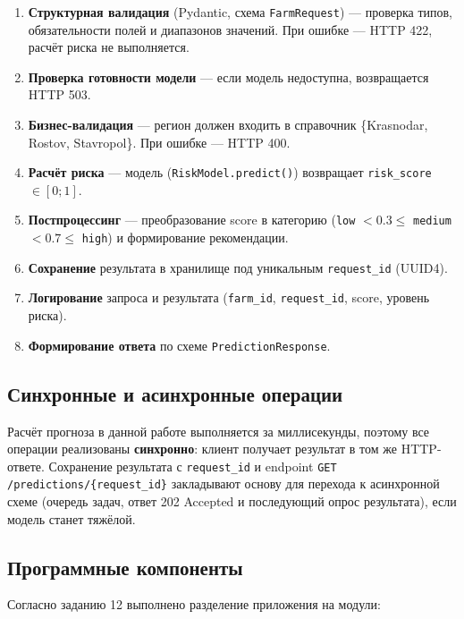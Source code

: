 \documentclass[12pt,a4paper]{article}
\begin{document}
\begin{enumerate}
    \item \textbf{Структурная валидация} (Pydantic, схема \texttt{FarmRequest}) --- проверка типов, обязательности полей и диапазонов значений. При ошибке --- HTTP 422, расчёт риска не выполняется.
    \item \textbf{Проверка готовности модели} --- если модель недоступна, возвращается HTTP 503.
    \item \textbf{Бизнес-валидация} --- регион должен входить в справочник \{Krasnodar, Rostov, Stavropol\}. При ошибке --- HTTP 400.
    \item \textbf{Расчёт риска} --- модель (\texttt{RiskModel.predict()}) возвращает \texttt{risk\_score} $\in [0; 1]$.
    \item \textbf{Постпроцессинг} --- преобразование score в категорию (\texttt{low} $< 0.3 \le$ \texttt{medium} $< 0.7 \le$ \texttt{high}) и формирование рекомендации.
    \item \textbf{Сохранение} результата в хранилище под уникальным \texttt{request\_id} (UUID4).
    \item \textbf{Логирование} запроса и результата (\texttt{farm\_id}, \texttt{request\_id}, score, уровень риска).
    \item \textbf{Формирование ответа} по схеме \texttt{PredictionResponse}.
\end{enumerate}

\subsection{Синхронные и асинхронные операции}

Расчёт прогноза в данной работе выполняется за миллисекунды, поэтому все операции реализованы \textbf{синхронно}: клиент получает результат в том же HTTP-ответе. Сохранение результата с \texttt{request\_id} и endpoint \texttt{GET /predictions/\{request\_id\}} закладывают основу для перехода к асинхронной схеме (очередь задач, ответ 202 Accepted и последующий опрос результата), если модель станет тяжёлой.

\subsection{Программные компоненты}

Согласно заданию 12 выполнено разделение приложения на модули:
\end{document}
